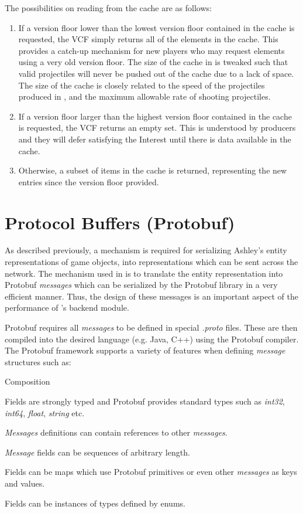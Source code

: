 The possibilities on reading from the cache are as follows:

\begin{enumerate}
    \item If a version floor lower than the lowest version floor contained in the cache is requested, the VCF simply returns all of the elements in the cache. This provides a catch-up mechanism for new players who may request elements using a very old version floor. The size of the cache in \game{} is tweaked such that valid projectiles will never be pushed out of the cache due to a lack of space. The size of the cache is closely related to the speed of the projectiles produced in \game{}, and the maximum allowable rate of shooting projectiles. 
    \item If a version floor larger than the highest version floor contained in the cache is requested, the VCF returns an empty set. This is understood by producers and they will defer satisfying the Interest until there is data available in the cache.
    \item Otherwise, a subset of items in the cache is returned, representing the new entries since the version floor provided.
\end{enumerate}



\section{Protocol Buffers (Protobuf)}\label{sec:impl:proto}
As described previously, a mechanism is required for serializing Ashley's entity representations of game objects, into representations which can be sent across the network. The mechanism used in \game{} is to translate the entity representation into Protobuf \cite{proto} \textit{messages} which can be serialized by the Protobuf library in a very efficient manner. Thus, the design of these messages is an important aspect of the performance of \game{}'s backend module. 

Protobuf requires all \textit{messages} to be defined in special \textit{.proto} files. These are then compiled into the desired language (e.g. Java, C++) using the Protobuf compiler. The Protobuf framework supports a variety of features when defining \textit{message} structures such as:

\begin{labeling}{Composition  }
    \item [Typing] Fields are strongly typed and Protobuf provides standard types such as \textit{int32}, \textit{int64}, \textit{float}, \textit{string} etc.
    \item [Composition] \textit{Messages} definitions can contain references to other \textit{messages}.
    \item [Sequences] \textit{Message} fields can be sequences of arbitrary length.
    \item [Maps] Fields can be maps which use Protobuf primitives or even other \textit{messages} as keys and values.
    \item [Enums] Fields can be instances of types defined by enums.
\end{labeling}

